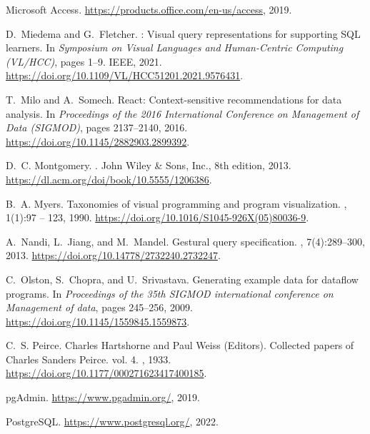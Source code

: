 \documentclass[letterpaper,11pt]{article}
\begin{document}
\begin{thebibliography}{100}
{Microsoft Access}.
\newblock \url{https://products.office.com/en-us/access}, 2019.

D.~Miedema and G.~Fletcher.
: Visual query representations for supporting {SQL} learners.
\newblock In {\em Symposium on Visual Languages and Human-Centric Computing
  ({VL/HCC})}, pages 1--9. {IEEE}, 2021.
\newblock \url{https://doi.org/10.1109/VL/HCC51201.2021.9576431}.

T.~Milo and A.~Somech.
\newblock React: Context-sensitive recommendations for data analysis.
\newblock In {\em Proceedings of the 2016 International Conference on
  Management of Data ({SIGMOD})}, pages 2137--2140, 2016.
\newblock \url{https://doi.org/10.1145/2882903.2899392}.

D.~C. Montgomery.
.
\newblock John Wiley \& Sons, Inc., 8th edition, 2013.
\newblock \url{https://dl.acm.org/doi/book/10.5555/1206386}.

B.~A. Myers.
\newblock Taxonomies of visual programming and program visualization.
, 1(1):97 -- 123, 1990.
\newblock \url{https://doi.org/10.1016/S1045-926X(05)80036-9}.

A.~Nandi, L.~Jiang, and M.~Mandel.
\newblock Gestural query specification.
, 7(4):289--300, 2013.
\newblock \url{https://doi.org/10.14778/2732240.2732247}.

C.~Olston, S.~Chopra, and U.~Srivastava.
\newblock Generating example data for dataflow programs.
\newblock In {\em Proceedings of the 35th SIGMOD international conference on
  Management of data}, pages 245--256, 2009.
\newblock \url{https://doi.org/10.1145/1559845.1559873}.

C.~S. Peirce.
\newblock Charles {H}artshorne and {P}aul {W}eiss ({E}ditors). {C}ollected
  papers of {C}harles {S}anders {P}eirce. vol. 4.
, 1933.
\newblock \url{https://doi.org/10.1177/000271623417400185}.

{pgAdmin}.
\newblock \url{https://www.pgadmin.org/}, 2019.

{PostgreSQL}.
\newblock \url{https://www.postgresql.org/}, 2022.


\end{thebibliography}
\end{document}

